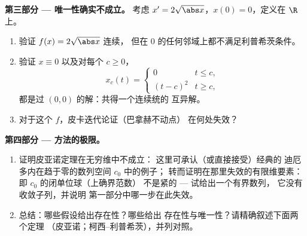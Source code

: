 \begin{problem}[{周末问题 --- 无利普希茨条件时
$x' = f(t, x)$ 解的存在性}]
\medskip
\noindent\textbf{第三部分 --- 唯一性确实不成立。}
考虑 $x' = 2\sqrt{\abs x}$，$x(0) = 0$，定义在 $\R$ 上。
\begin{enumerate}[resume]
  \item 验证 $f(x) = 2\sqrt{\abs x}$ 连续，
        但在 $0$ 的任何邻域上都不满足利普希茨条件。
  \item 验证 $x \equiv 0$ 以及对每个 $c \geq 0$，
        \[
        x_c(t) = \begin{cases} 0 & t \leq c,\\ (t - c)^2 & t
        \geq c,\end{cases}
        \]
        都是过 $(0,0)$ 的解：共得一个连续统的
        互异解。
  \item 对于这个 $f$，皮卡迭代论证（巴拿赫不动点）
        在何处失效？
\end{enumerate}

\medskip
\noindent\textbf{第四部分 --- 方法的极限。}
\begin{enumerate}[resume]
  \item 证明皮亚诺定理在无穷维中不成立：
        这里可承认（或直接接受）经典的
        迪厄多内在趋于零的数列空间 $c_0$ 中的例子；
        转而证明在那里失效的有限维要素：
        即 $c_0$ 的闭单位球（上确界范数）
        不是紧的 --- 试给出一个有界数列，
        它没有收敛子列，并说明
        第一部分中哪一步在此失效。
  \item 总结：哪些假设给出存在性？哪些给出
        存在性与唯一性？请精确叙述下面两个定理
        （皮亚诺；柯西--利普希茨），并列对照。
\end{enumerate}


\end{problem}
